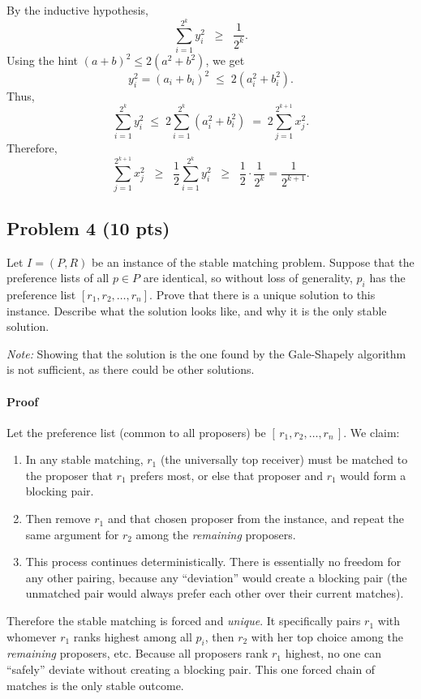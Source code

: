 \documentclass[12pt]{article}
\begin{document}
By the inductive hypothesis,
\[
\sum_{i=1}^{2^k} y_i^2 \;\;\ge\;\; \frac{1}{2^k}.
\]
Using the hint $(a+b)^2 \le 2(a^2 + b^2)$, we get
\[
y_i^2 = (a_i + b_i)^2 \;\le\; 2(a_i^2 + b_i^2).
\]
Thus,
\[
\sum_{i=1}^{2^k} y_i^2 \;\le\; 2 \sum_{i=1}^{2^k} (a_i^2 + b_i^2) \;=\; 2 \sum_{j=1}^{2^{k+1}} x_j^2.
\]
Therefore,
\[
\sum_{j=1}^{2^{k+1}} x_j^2 
\;\;\ge\;\; \frac{1}{2} \sum_{i=1}^{2^k} y_i^2 
\;\;\ge\;\; \frac{1}{2} \cdot \frac{1}{2^k}
= \frac{1}{2^{k+1}}.
\]

\subsection*{Problem 4 (10 pts)}

Let $I = (P, R)$ be an instance of the stable matching problem. Suppose that the preference lists of all $p \in P$ are identical, so without loss of generality, $p_i$ has the preference list $[r_1, r_2, \ldots, r_n]$. Prove that there is a unique solution to this instance. Describe what the solution looks like, and why it is the only stable solution.

\textit{Note:} Showing that the solution is the one found by the Gale-Shapely algorithm is not sufficient, as there could be other solutions.

\paragraph{Proof} 
Let the preference list (common to all proposers) be $[\,r_1, r_2, \dots, r_n\,]$. We claim:
\begin{enumerate}
    \item In any stable matching, $r_1$ (the universally top receiver) must be matched to the proposer that $r_1$ prefers most, or else that proposer and $r_1$ would form a blocking pair.
    \item Then remove $r_1$ and that chosen proposer from the instance, and repeat the same argument for $r_2$ among the \emph{remaining} proposers.
    \item This process continues deterministically. There is essentially no freedom for any other pairing, because any ``deviation'' would create a blocking pair (the unmatched pair would always prefer each other over their current matches).
\end{enumerate}
Therefore the stable matching is forced and \emph{unique}. It specifically pairs $r_1$ with whomever $r_1$ ranks highest among all $p_i$, then $r_2$ with her top choice among the \emph{remaining} proposers, etc. Because all proposers rank $r_1$ highest, no one can ``safely'' deviate without creating a blocking pair. This one forced chain of matches is the only stable outcome.
\end{document}
